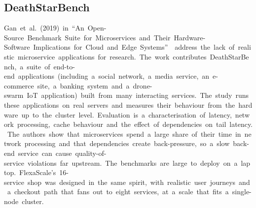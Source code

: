 \documentclass[12pt,a4paper,oneside]{report}
\begin{document}
\subsection{DeathStarBench}

Gan~et~al.~(2019)~in~``An~Open-Source~Benchmark~Suite~for~Microservices~and~Their~Hardware-Software~Implications~for~Cloud~and~Edge~Systems''~\cite{deathstar}~address~the~lack~of~realistic~microservice~applications~for~research.~The~work~contributes~DeathStarBench,~a~suite~of~end-to-end~applications~(including~a~social~network,~a~media~service,~an~e-commerce~site,~a~banking~system~and~a~drone-swarm~IoT~application)~built~from~many~interacting~services.~The~study~runs~these~applications~on~real~servers~and~measures~their~behaviour~from~the~hardware~up~to~the~cluster~level.~Evaluation~is~a~characterisation~of~latency,~network~processing,~cache~behaviour~and~the~effect~of~dependencies~on~tail~latency.~The~authors~show~that~microservices~spend~a~large~share~of~their~time~in~network~processing~and~that~dependencies~create~back-pressure,~so~a~slow~back-end~service~can~cause~quality-of-service~violations~far~upstream.~The~benchmarks~are~large~to~deploy~on~a~laptop.~FlexaScale's~16-service~shop~was~designed~in~the~same~spirit,~with~realistic~user~journeys~and~a~checkout~path~that~fans~out~to~eight~services,~at~a~scale~that~fits~a~single-node~cluster.
\end{document}
